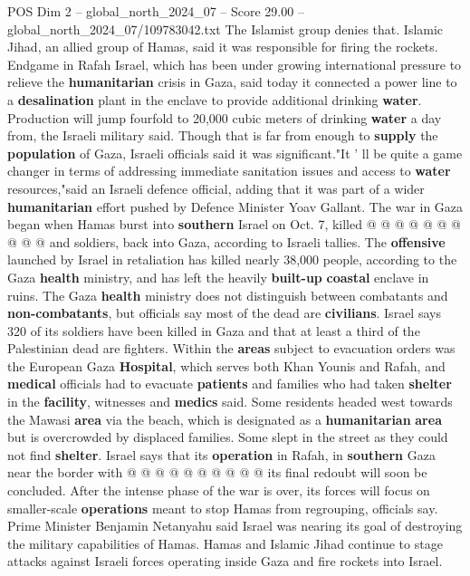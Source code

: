 \begin{textsample}{POS Dim 2 – global\_north\_2024\_07 – Score 29.00 – global\_north\_2024\_07/109783042.txt}
The Islamist group denies that.
Islamic Jihad, an allied group of Hamas, said it was responsible for firing the rockets.
Endgame in Rafah Israel, which has been under growing international pressure to relieve the \textbf{humanitarian} crisis in Gaza, said today it connected a power line to a \textbf{desalination} plant in the enclave to provide additional drinking \textbf{water}.
Production will jump fourfold to 20,000 cubic meters of drinking \textbf{water} a day from, the Israeli military said.
Though that is far from enough to \textbf{supply} the \textbf{population} of Gaza, Israeli officials said it was significant."It ' ll be quite a game changer in terms of addressing immediate sanitation issues and access to \textbf{water} resources,"said an Israeli defence official, adding that it was part of a wider \textbf{humanitarian} effort pushed by Defence Minister Yoav Gallant.
The war in Gaza began when Hamas burst into \textbf{southern} Israel on Oct. 7, killed @ @ @ @ @ @ @ @ @ @ and soldiers, back into Gaza, according to Israeli tallies.
The \textbf{offensive} launched by Israel in retaliation has killed nearly 38,000 people, according to the Gaza \textbf{health} ministry, and has left the heavily \textbf{built-up} \textbf{coastal} enclave in ruins.
The Gaza \textbf{health} ministry does not distinguish between combatants and \textbf{non-combatants}, but officials say most of the dead are \textbf{civilians}.
Israel says 320 of its soldiers have been killed in Gaza and that at least a third of the Palestinian dead are fighters.
Within the \textbf{areas} subject to evacuation orders was the European Gaza \textbf{Hospital}, which serves both Khan Younis and Rafah, and \textbf{medical} officials had to evacuate \textbf{patients} and families who had taken \textbf{shelter} in the \textbf{facility}, witnesses and \textbf{medics} said.
Some residents headed west towards the Mawasi \textbf{area} via the beach, which is designated as a \textbf{humanitarian} \textbf{area} but is overcrowded by displaced families.
Some slept in the street as they could not find \textbf{shelter}.
Israel says that its \textbf{operation} in Rafah, in \textbf{southern} Gaza near the border with @ @ @ @ @ @ @ @ @ @ its final redoubt will soon be concluded.
After the intense phase of the war is over, its forces will focus on smaller-scale \textbf{operations} meant to stop Hamas from regrouping, officials say.
Prime Minister Benjamin Netanyahu said Israel was nearing its goal of destroying the military capabilities of Hamas.
Hamas and Islamic Jihad continue to stage attacks against Israeli forces operating inside Gaza and fire rockets into Israel.

\end{textsample}
